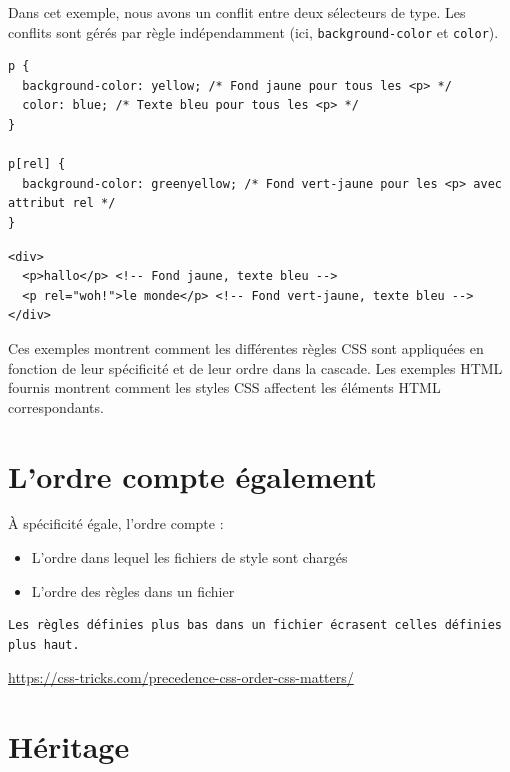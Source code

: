 \documentclass{report}
\begin{document}
\begin{multicols*}{2}
Dans cet exemple, nous avons un conflit entre deux sélecteurs de type. Les conflits sont gérés par règle indépendamment (ici, \texttt{background-color} et \texttt{color}).

\begin{lstlisting}[style=CSSDraculaLight]
p {
  background-color: yellow; /* Fond jaune pour tous les <p> */
  color: blue; /* Texte bleu pour tous les <p> */
}

p[rel] {
  background-color: greenyellow; /* Fond vert-jaune pour les <p> avec attribut rel */
}
\end{lstlisting}

\begin{lstlisting}[style=HTMLDraculaDark]
<div>
  <p>hallo</p> <!-- Fond jaune, texte bleu -->
  <p rel="woh!">le monde</p> <!-- Fond vert-jaune, texte bleu -->
</div>
\end{lstlisting}

Ces exemples montrent comment les différentes règles CSS sont appliquées en fonction de leur spécificité et de leur ordre dans la cascade. Les exemples HTML fournis montrent comment les styles CSS affectent les éléments HTML correspondants.


\section*{L'ordre compte également}

À spécificité égale, l’ordre compte :
\begin{itemize}
    \item L’ordre dans lequel les fichiers de style sont chargés
    \item L’ordre des règles dans un fichier
\end{itemize}

\begin{verbatim}
Les règles définies plus bas dans un fichier écrasent celles définies plus haut.
\end{verbatim}

\url{https://css-tricks.com/precedence-css-order-css-matters/}

\section*{Héritage}


\end{multicols*}
\end{document}
